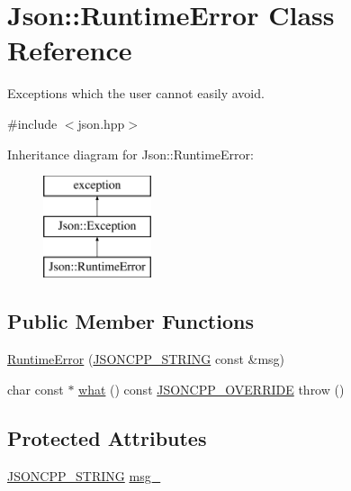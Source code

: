 \hypertarget{classJson_1_1RuntimeError}{}\section{Json\+:\+:Runtime\+Error Class Reference}
\label{classJson_1_1RuntimeError}


Exceptions which the user cannot easily avoid.  




{\ttfamily \#include $<$json.\+hpp$>$}

Inheritance diagram for Json\+:\+:Runtime\+Error\+:\begin{figure}[H]
\begin{center}
\leavevmode
\includegraphics[height=3.000000cm]{classJson_1_1RuntimeError}
\end{center}
\end{figure}
\subsection*{Public Member Functions}
\begin{DoxyCompactItemize}
\item 
\hyperlink{classJson_1_1RuntimeError_a0f6445dc345ce0a703610b6e893fee40}{Runtime\+Error} (\hyperlink{json_8hpp_a1e723f95759de062585bc4a8fd3fa4be}{J\+S\+O\+N\+C\+P\+P\+\_\+\+S\+T\+R\+I\+NG} const \&msg)
\item 
char const $\ast$ \hyperlink{classJson_1_1Exception_a5a9ed7d91b828b9be81706ef9d483ed6}{what} () const \hyperlink{json_8hpp_a824d6199c91488107e443226fa6022c5}{J\+S\+O\+N\+C\+P\+P\+\_\+\+O\+V\+E\+R\+R\+I\+DE}  throw ()
\end{DoxyCompactItemize}
\subsection*{Protected Attributes}
\begin{DoxyCompactItemize}
\item 
\hyperlink{json_8hpp_a1e723f95759de062585bc4a8fd3fa4be}{J\+S\+O\+N\+C\+P\+P\+\_\+\+S\+T\+R\+I\+NG} \hyperlink{classJson_1_1Exception_aae3cbb8b45bf21480f64502a8329659f}{msg\+\_\+}
\end{DoxyCompactItemize}


